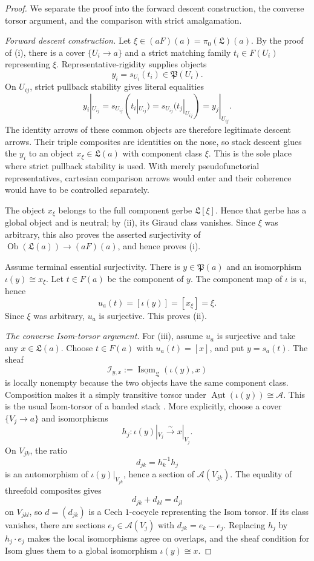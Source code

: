 \begin{proof}
We separate the proof into the forward descent construction, the converse
torsor argument, and the comparison with strict amalgamation.

\medskip
\noindent\emph{Forward descent construction.}
Let
\(\xi\in(aF)(a)=\pi_0(\mathfrak L)(a)\).  By the proof of
(i), there is a cover
\(\{U_i\to a\}\) and a strict matching family \(t_i\in F(U_i)\)
representing \(\xi\).  Representative-rigidity supplies objects
\[
 y_i=s_{U_i}(t_i)\in\mathfrak P(U_i).
\]
On \(U_{ij}\), strict pullback stability gives literal equalities
\[
 y_i|_{U_{ij}}
 =s_{U_{ij}}(t_i|_{U_{ij}})
 =s_{U_{ij}}(t_j|_{U_{ij}})
 =y_j|_{U_{ij}}.
\]
The identity arrows of these common objects are therefore legitimate
descent arrows.  Their triple composites are identities on the nose, so
stack descent glues the \(y_i\) to an object
\(x_\xi\in\mathfrak L(a)\) with component class \(\xi\).  This is the sole
place where strict pullback stability is used.  With merely
pseudofunctorial representatives, cartesian comparison arrows would enter
and their coherence would have to be controlled separately.

The object \(x_\xi\) belongs to the full component gerbe
\(\mathfrak L[\xi]\).  Hence that gerbe has a global object and is neutral;
by (ii), its Giraud class
vanishes.  Since \(\xi\) was arbitrary, this also proves the asserted
surjectivity of
\(\operatorname{Ob}(\mathfrak L(a))\to(aF)(a)\), and hence proves (i).

Assume terminal essential surjectivity.  There is
\(y\in\mathfrak P(a)\) and an isomorphism
\(\iota(y)\cong x_\xi\).  Let \(t\in F(a)\) be the component of \(y\).
The component map of \(\iota\) is \(u\), hence
\[
 u_a(t)=[\iota(y)]=[x_\xi]=\xi.
\]
Since \(\xi\) was arbitrary, \(u_a\) is surjective.  This proves (ii).

\medskip
\noindent\emph{The converse Isom-torsor argument.}
For (iii), assume \(u_a\) is surjective and take any
\(x\in\mathfrak L(a)\).  Choose \(t\in F(a)\) with
\(u_a(t)=[x]\), and put \(y=s_a(t)\).  The sheaf
\[
 \mathcal I_{y,x}:=
 \underline{\operatorname{Isom}}_{\mathfrak L}(\iota(y),x)
\]
is locally nonempty because the two objects have the same component class.
Composition makes it a simply transitive torsor under
\(\underline{\operatorname{Aut}}(\iota(y))\cong\mathscr A\).  This is the
usual Isom-torsor of a banded stack
\cite[Chap.~III]{MacLaneMoerdijk1994}.
More explicitly, choose a cover \(\{V_j\to a\}\) and isomorphisms
\[
 h_j:\iota(y)|_{V_j}\xrightarrow{\sim}x|_{V_j}.
\]
On \(V_{jk}\), the ratio
\[
 d_{jk}=h_k^{-1}h_j
\]
is an automorphism of \(\iota(y)|_{V_{jk}}\), hence a section of
\(\mathscr A(V_{jk})\).  The equality of threefold composites gives
\[
 d_{jk}+d_{kl}=d_{jl}
\]
on \(V_{jkl}\), so \(d=(d_{jk})\) is a Cech \(1\)-cocycle representing
the Isom torsor.  If its class vanishes, there are sections
\(e_j\in\mathscr A(V_j)\) with \(d_{jk}=e_k-e_j\).  Replacing
\(h_j\) by \(h_j\cdot e_j\) makes the local isomorphisms agree on overlaps,
and the sheaf condition for Isom glues them to a global isomorphism
\(\iota(y)\cong x\).


\end{proof}
